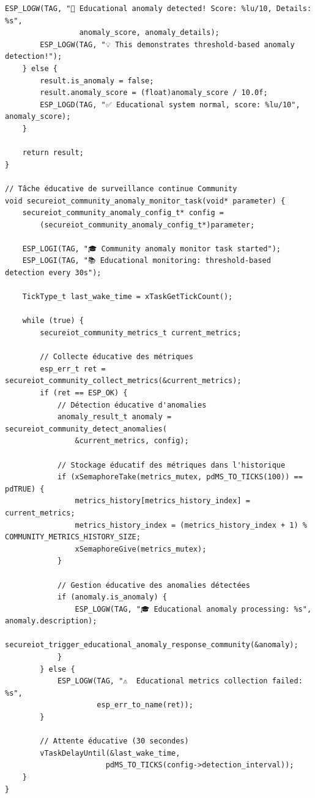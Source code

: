 \begin{lstlisting}[caption={Module éducatif de détection d'anomalies par seuils}]
        ESP_LOGW(TAG, "🚨 Educational anomaly detected! Score: %lu/10, Details: %s", 
                 anomaly_score, anomaly_details);
        ESP_LOGW(TAG, "💡 This demonstrates threshold-based anomaly detection!");
    } else {
        result.is_anomaly = false;
        result.anomaly_score = (float)anomaly_score / 10.0f;
        ESP_LOGD(TAG, "✅ Educational system normal, score: %lu/10", anomaly_score);
    }
    
    return result;
}

// Tâche éducative de surveillance continue Community
void secureiot_community_anomaly_monitor_task(void* parameter) {
    secureiot_community_anomaly_config_t* config = 
        (secureiot_community_anomaly_config_t*)parameter;
    
    ESP_LOGI(TAG, "🎓 Community anomaly monitor task started");
    ESP_LOGI(TAG, "📚 Educational monitoring: threshold-based detection every 30s");
    
    TickType_t last_wake_time = xTaskGetTickCount();
    
    while (true) {
        secureiot_community_metrics_t current_metrics;
        
        // Collecte éducative des métriques
        esp_err_t ret = secureiot_community_collect_metrics(&current_metrics);
        if (ret == ESP_OK) {
            // Détection éducative d'anomalies
            anomaly_result_t anomaly = secureiot_community_detect_anomalies(
                &current_metrics, config);
            
            // Stockage éducatif des métriques dans l'historique
            if (xSemaphoreTake(metrics_mutex, pdMS_TO_TICKS(100)) == pdTRUE) {
                metrics_history[metrics_history_index] = current_metrics;
                metrics_history_index = (metrics_history_index + 1) % COMMUNITY_METRICS_HISTORY_SIZE;
                xSemaphoreGive(metrics_mutex);
            }
            
            // Gestion éducative des anomalies détectées
            if (anomaly.is_anomaly) {
                ESP_LOGW(TAG, "🎓 Educational anomaly processing: %s", anomaly.description);
                secureiot_trigger_educational_anomaly_response_community(&anomaly);
            }
        } else {
            ESP_LOGW(TAG, "⚠️  Educational metrics collection failed: %s", 
                     esp_err_to_name(ret));
        }
        
        // Attente éducative (30 secondes)
        vTaskDelayUntil(&last_wake_time, 
                       pdMS_TO_TICKS(config->detection_interval));
    }
}
\end{lstlisting}

